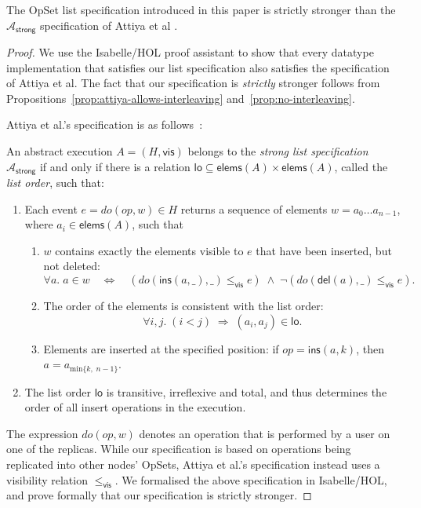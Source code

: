 \begin{proposition}
    The OpSet list specification introduced in this paper is strictly stronger than the $\mathcal{A}_\textsf{strong}$ specification of Attiya et al \cite{Attiya:2016kh}.
\end{proposition}
\begin{proof}
    We use the Isabelle/HOL proof assistant to show that every datatype implementation that satisfies our list specification also satisfies the specification of Attiya et al.
    The fact that our specification is \emph{strictly} stronger follows from Propositions~\ref{prop:attiya-allows-interleaving} and~\ref{prop:no-interleaving}.

Attiya et al.'s specification is as follows~\cite{Attiya:2016kh}:
\begin{displayquote}
An abstract execution $A = (H, \textsf{vis})$ belongs to the \emph{strong list specification} $\mathcal{A}_\textsf{strong}$ if and only if there is a relation $\textsf{lo} \subseteq \textsf{elems}(A) \times \textsf{elems}(A)$, called the \emph{list order}, such that:
\begin{enumerate}
\item Each event $e = \mathit{do}(\mathit{op}, w) \in H$ returns a sequence of elements $w=a_0 \dots a_{n-1}$, where $a_i \in \textsf{elems}(A)$, such that
\begin{enumerate}
\item $w$ contains exactly the elements visible to $e$ that have been inserted, but not deleted:
\[ \forall a.\; a \in w \quad\Longleftrightarrow\quad (\mathit{do}(\textsf{ins}(a, \_), \_) \le_\textsf{vis} e)
\;\wedge\; \neg(\mathit{do}(\textsf{del}(a), \_) \le_\textsf{vis} e). \]
\item The order of the elements is consistent with the list order:
\[ \forall i, j.\; (i < j) \;\Longrightarrow\; (a_i, a_j) \in \textsf{lo}. \]
\item Elements are inserted at the specified position:
if $\mathit{op} = \textsf{ins}(a, k)$, then $a = a_{\mathrm{min} \{k,\; n-1\}}$.
\end{enumerate}
\item The list order $\textsf{lo}$ is transitive, irreflexive and total, and thus determines the order of all insert operations in the execution.
\end{enumerate}
\end{displayquote}

The expression $\mathit{do}(\mathit{op}, w)$ denotes an operation that is performed by a user on one of the replicas.
While our specification is based on operations being replicated into other nodes' OpSets, Attiya et al.'s specification instead uses a visibility relation $\le_\textsf{vis}$.
We formalised the above specification in Isabelle/HOL, and prove formally that our specification is strictly stronger.
\end{proof}

